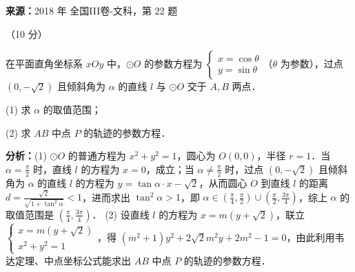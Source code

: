 \begin{question}[points=10]
\textbf{来源：}2018 年 全国III卷-文科，第 22 题\par
[选修 4-4：坐标系与参数方程]（10 分）

在平面直角坐标系 $xOy$ 中，$\odot O$ 的参数方程为 $\begin{cases} x=\cos\theta \\ y=\sin\theta \end{cases}$（$\theta$ 为参数），过点 $(0,-\sqrt{2})$ 且倾斜角为 $\alpha$ 的直线 $l$ 与 $\odot O$ 交于 $A,B$ 两点．

(1) 求 $\alpha$ 的取值范围；

(2) 求 $AB$ 中点 $P$ 的轨迹的参数方程．
\begin{solution}

\textbf{分析：}(1) $\odot O$ 的普通方程为 $x^2+y^2=1$，圆心为 $O(0,0)$，半径 $r=1$．当 $\alpha=\frac{\pi}{2}$ 时，直线 $l$ 的方程为 $x=0$，成立；当 $\alpha\neq\frac{\pi}{2}$ 时，过点 $(0,-\sqrt{2})$ 且倾斜角为 $\alpha$ 的直线 $l$ 的方程为 $y=\tan\alpha\cdot x-\sqrt{2}$，从而圆心 $O$ 到直线 $l$ 的距离 $d=\frac{\sqrt{2}}{\sqrt{1+\tan^2\alpha}}<1$，进而求出 $\tan^2\alpha>1$，即 $\alpha\in(\frac{\pi}{4},\frac{\pi}{2})\cup(\frac{\pi}{2},\frac{3\pi}{4})$，综上 $\alpha$ 的取值范围是 $(\frac{\pi}{4},\frac{3\pi}{4})$．
(2) 设直线 $l$ 的方程为 $x=m(y+\sqrt{2})$，联立 $\begin{cases} x=m(y+\sqrt{2}) \\ x^2+y^2=1 \end{cases}$，得 $(m^2+1)y^2+2\sqrt{2}m^2y+2m^2-1=0$，由此利用韦达定理、中点坐标公式能求出 $AB$ 中点 $P$ 的轨迹的参数方程．


\end{solution}
\end{question}
